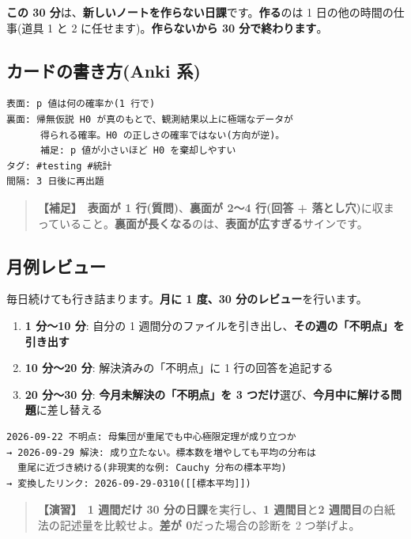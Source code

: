 \documentclass{article}
\begin{document}
\textbf{この 30 分}は、\textbf{新しいノートを作らない日課}です。\textbf{作る}のは 1 日の他の時間の仕事(道具 1 と 2 に任せます)。\textbf{作らないから 30 分で終わります}。

\subsection{カードの書き方(Anki 系)}

\begin{lstlisting}[language=Text]
表面: p 値は何の確率か(1 行で)
裏面: 帰無仮説 H0 が真のもとで、観測結果以上に極端なデータが
      得られる確率。H0 の正しさの確率ではない(方向が逆)。
      補足: p 値が小さいほど H0 を棄却しやすい
タグ: #testing #統計
間隔: 3 日後に再出題
\end{lstlisting}

\begin{quote}
\textbf{【補足】}\ \textbf{表面が 1 行(質問)}、\textbf{裏面が 2〜4 行(回答 + 落とし穴)}に収まっていること。\textbf{裏面が長くなる}のは、\textbf{表面が広すぎる}サインです。
\end{quote}

\subsection{月例レビュー}

毎日続けても行き詰まります。\textbf{月に 1 度、30 分のレビュー}を行います。

\begin{enumerate}
\item \textbf{1 分〜10 分}: 自分の 1 週間分のファイルを引き出し、\textbf{その週の「不明点」を引き出す}
\item \textbf{10 分〜20 分}: 解決済みの「不明点」に 1 行の回答を追記する
\item \textbf{20 分〜30 分}: \textbf{今月未解決の「不明点」を 3 つだけ}選び、\textbf{今月中に解ける問題}に差し替える
\end{enumerate}

\begin{lstlisting}[language=Text]
2026-09-22 不明点: 母集団が重尾でも中心極限定理が成り立つか
→ 2026-09-29 解決: 成り立たない。標本数を増やしても平均の分布は
  重尾に近づき続ける(非現実的な例: Cauchy 分布の標本平均)
→ 変換したリンク: 2026-09-29-0310([[標本平均]])
\end{lstlisting}

\begin{quote}
\textbf{【演習】}\ \textbf{1 週間だけ 30 分の日課}を実行し、\textbf{1 週間目}と\textbf{2 週間目}の白紙法の記述量を比較せよ。\textbf{差が 0}だった場合の診断を 2 つ挙げよ。
\end{quote}
\end{document}

